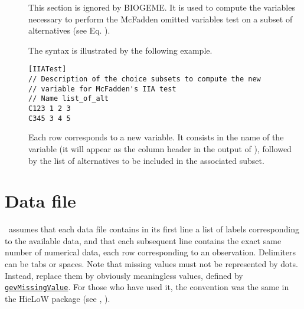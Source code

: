 \documentclass[12pt]{memoir}
\begin{document}
\begin{description}
\item[]  This section is ignored by BIOGEME. It is used to compute the variables necessary to perform the McFadden omitted variables test on a subset of alternatives (see Eq. ).

The syntax is illustrated by the following example.
{\footnotesize
\begin{verbatim}
[IIATest]
// Description of the choice subsets to compute the new 
// variable for McFadden's IIA test
// Name list_of_alt
C123 1 2 3
C345 3 4 5
\end{verbatim}
}
Each row corresponds to a new variable. It consists in the name of the variable (it will appear as the column header in the output of \BIOSIM ), followed by the list of alternatives to be included in the associated subset. 

\end{description}




\section{Data file}
\label{sec:data}
   \BIOGEME\ assumes that each data file contains in its first line a
   list of labels corresponding to the available data, and that each
   subsequent line contains the exact same number of numerical data,
   each row corresponding to an observation.  Delimiters can be tabs
   or spaces.  Note that missing values must not be represented by
   dots. Instead, replace them by obviously meaningless values,
   defined by
   \hyperlink{gevMissingValue}{\texttt{gevMissingValue}}. For those
   who have used it, the convention was the same in the HieLoW package
   (see \cite{BierVand95}, \cite{Bier95a}).
\end{document}
